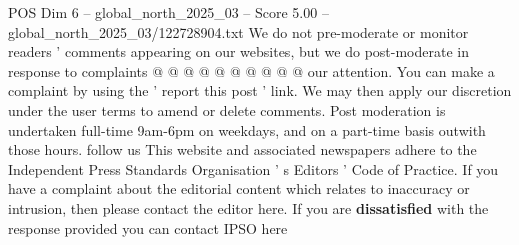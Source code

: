 \begin{textsample}{POS Dim 6 – global\_north\_2025\_03 – Score 5.00 – global\_north\_2025\_03/122728904.txt}
We do not pre-moderate or monitor readers ' comments appearing on our websites, but we do post-moderate in response to complaints @ @ @ @ @ @ @ @ @ @ our attention.
You can make a complaint by using the ' report this post ' link.
We may then apply our discretion under the user terms to amend or delete comments.
Post moderation is undertaken full-time 9am-6pm on weekdays, and on a part-time basis outwith those hours. follow us This website and associated newspapers adhere to the Independent Press Standards Organisation ' s Editors ' Code of Practice.
If you have a complaint about the editorial content which relates to inaccuracy or intrusion, then please contact the editor here.
If you are \textbf{dissatisfied} with the response provided you can contact IPSO here

\end{textsample}
